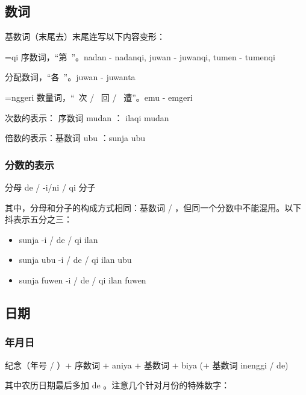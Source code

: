 \subsection{数词}

基数词（末尾去）末尾连写以下内容变形：

\begin{des}
    \item[=qi] 序数词，“第~”。\irg nadan - nadanqi, juwan - juwanqi, tumen - tumenqi
    \item[\ii{=ta}{=te}{=to}] 分配数词，“各~”。\irg juwan - juwanta
    \item[=nggeri] 数量词，“~次 / ~回 / ~遭”。\irg emu - emgeri
\end{des}

次数的表示： 序数词 mudan ： ilaqi mudan

倍数的表示：基数词 ubu ：sunja ubu

\subsubsection{分数的表示}

\begin{center}
    分母 de / -i/ni / qi 分子
\end{center}

其中，分母和分子的构成方式相同：基数词  / ，但同一个分数中不能混用。以下抖表示五分之三：

\begin{itemize}
    \item sunja -i / de / qi ilan
    \item sunja ubu -i / de / qi ilan ubu
    \item sunja fuwen -i / de / qi ilan fuwen
\end{itemize}

\subsection{日期}

\subsubsection{年月日}

\begin{center}
    纪念（年号 / ）+ 序数词 + aniya + 基数词 + biya (+ 基数词 inenggi / de)
\end{center}

其中农历日期最后多加 de 。注意几个针对月份的特殊数字：

